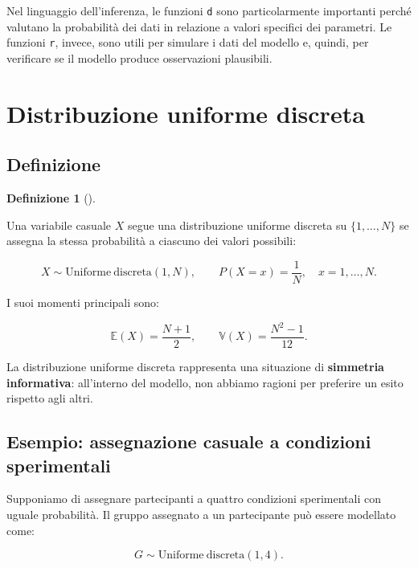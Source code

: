 \documentclass[
  italian,
  letterpaper,
  a4paper,
  11pt,
  open=any]{scrbook}
\theoremstyle{plain}
\theoremstyle{definition}
\theoremstyle{definition}
\newtheorem{definition}{Definizione}[chapter]
\theoremstyle{remark}
\begin{document}
Nel linguaggio dell'inferenza, le funzioni \texttt{d} sono
particolarmente importanti perché valutano la probabilità dei dati in
relazione a valori specifici dei parametri. Le funzioni \texttt{r},
invece, sono utili per simulare i dati del modello e, quindi, per
verificare se il modello produce osservazioni plausibili.

\section{Distribuzione uniforme discreta}\label{sec-discrete-uniform}

\subsection{Definizione}\label{definizione}

\begin{definition}[]\protect\hypertarget{def-uniform-discrete}{}\label{def-uniform-discrete}

Una variabile casuale \(X\) segue una distribuzione uniforme discreta su
\(\{1,\ldots,N\}\) se assegna la stessa probabilità a ciascuno dei
valori possibili:

\[
X \sim \mathrm{Uniforme\ discreta}(1,N),
\qquad
P(X=x) = \frac{1}{N}, \quad x = 1,\ldots,N.
\]

I suoi momenti principali sono:

\[
\mathbb{E}(X) = \frac{N+1}{2},
\qquad
\mathbb{V}(X) = \frac{N^2 - 1}{12}.
\]

\end{definition}

La distribuzione uniforme discreta rappresenta una situazione di
\textbf{simmetria informativa}: all'interno del modello, non abbiamo
ragioni per preferire un esito rispetto agli altri.

\subsection{Esempio: assegnazione casuale a condizioni
sperimentali}\label{esempio-assegnazione-casuale-a-condizioni-sperimentali}

Supponiamo di assegnare partecipanti a quattro condizioni sperimentali
con uguale probabilità. Il gruppo assegnato a un partecipante può essere
modellato come:

\[
G \sim \mathrm{Uniforme\ discreta}(1,4).
\]
\end{document}
